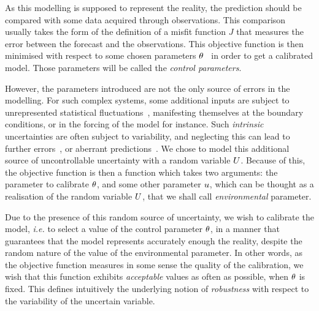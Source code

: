 \documentclass[../../Main_ManuscritThese.tex]{subfiles}
\begin{document}
As this modelling is supposed to represent the reality, the prediction
should be compared with some data acquired through observations. This
comparison usually takes the form of the definition of a misfit
function $J$ that measures the error between the forecast and the
observations. This objective function is then minimised with respect to
some chosen parameters
$\theta$~\cite{das_estimation_1991,das_variational_1992,boutet_estimation_2015}
in order to get a calibrated model. Those parameters will be called
the \emph{control parameters}.

However, the parameters introduced are not the only source of errors
in the modelling.  %
For such complex systems, some additional inputs are subject to
unrepresented statistical fluctuations~\cite{zanna_ocean_2011},
manifesting themselves at the boundary conditions, or in the forcing
of the model for instance. Such \emph{intrinsic} uncertainties are
often subject to variability, and neglecting this can lead to further
errors~\cite{mcwilliams_irreducible_2007}, or aberrant
predictions~\cite{kuczera_there_2010}.
We chose to model this
additional source of uncontrollable uncertainty with a random variable
$U$.  Because of this, the objective function is then a function which
takes two arguments: the parameter to calibrate $\theta$,
and some other parameter $u$, which can be thought as a realisation
of the random variable $U$, that we shall call \emph{environmental}
parameter.

Due to the presence of this random source of uncertainty, we wish to
calibrate the model, \emph{i.e.} to select a value of the control
parameter $\theta$, in a manner that guarantees that the model represents
accurately enough the reality, despite the random nature of the value of
the environmental parameter. In other words, as the objective function
measures in some sense the quality of the calibration, we wish that
this function exhibits \emph{acceptable} values as often as possible,
when $\theta$ is fixed. This defines intuitively the underlying notion of
\emph{robustness} with respect to the variability of the uncertain
variable.
\end{document}
